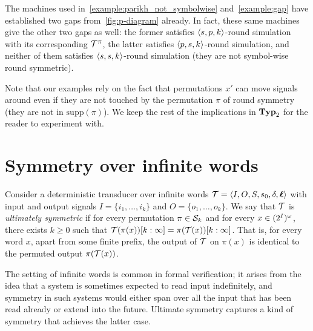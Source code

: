 The machines used in~\cref{example:parikh_not_symbolwise} and~\cref{example:gap} have established two gaps from~\cref{fig:p-diagram} already. In fact, these same machines give the other two gaps as well: the former satisfies $\left< s,p,k\right>$-round simulation with its corresponding $\mathcal{T}^\pi$, the latter satisfies $\left< p,s,k\right>$-round simulation, and neither of them satisfies $\left< s,s,k\right>$-round simulation (they are not symbol-wise round symmetric).

Note that our examples rely on the fact that permutations $x'$ can move signals around even if they are not touched by the permutation $\pi$ of round symmetry (they are not in $\mathrm{supp}(\pi)$). We keep the rest of the implications in $\mathbf{Typ}_2$ for the reader to experiment with.

\section{Symmetry over infinite words}

Consider a deterministic transducer over infinite words $\mathcal{T}=\left< I,O,S,s_0,\delta,\boldsymbol{\ell}\right>$ with input and output signals $I=\{i_1,\ldots,i_k\}$ and $O=\{o_1,\ldots,o_k\}$. We say that $\mathcal{T}$ is \emph{ultimately symmetric} if for every permutation $\pi\in \mathcal{S}_k$ and for every $x\in (2^{I})^\omega$, there exists $k\ge 0$ such that $\mathcal{T}(\pi(x))[k:\infty]=\pi(\mathcal{T}(x))[k:\infty]$. That is, for every word $x$, apart from some finite prefix, the output of $\mathcal{T}$ on $\pi(x)$ is identical to the permuted output $\pi(\mathcal{T}(x))$.

The setting of infinite words is common in formal verification; it arises from the idea that a system is sometimes expected to read input indefinitely, and symmetry in such systems would either span over all the input that has been read already or extend into the future. Ultimate symmetry captures a kind of symmetry that achieves the latter case.

